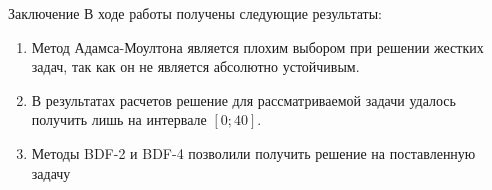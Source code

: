 \documentclass[ignoreonframetext,unicode]{beamer}
\begin{document}
\begin{frame}{Заключение}
	В ходе работы получены следующие результаты:
	\begin{block}{}
	\begin{enumerate}	
		\item Метод Адамса-Моултона является плохим выбором при решении жестких задач, так как он не является абсолютно устойчивым.
		\item В результатах расчетов решение для рассматриваемой задачи удалось получить лишь на интервале $[0; 40]$.
		\item 
		Методы BDF-2 и BDF-4 позволили получить решение на поставленную задачу
	\end{enumerate}
	\end{block}	
\end{frame}	
\end{document}
